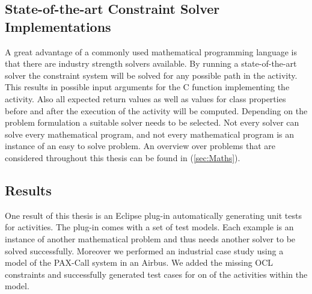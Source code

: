 \subsection{State-of-the-art Constraint Solver Implementations} 
A great advantage of a commonly used mathematical programming language is that there are industry strength solvers available. By running a state-of-the-art solver the constraint system will be solved for any possible path in the activity. This results in possible input arguments for the C function implementing the activity. Also all expected return values as well as values for class properties before and after the execution of the activity will be computed. Depending on the problem formulation a suitable solver needs to be selected. Not every solver can solve every mathematical program, and not every mathematical program is an instance of an easy to solve problem. An overview over problems that are considered throughout this thesis can be found in (\ref{sec:Maths}).
\subsection{Results}
One result of this thesis is an Eclipse plug-in automatically generating unit tests for activities. The plug-in comes with a set of test models. Each example is an instance of another mathematical problem and thus needs another solver to be solved successfully. Moreover we performed an industrial case study using a model of the PAX-Call system in an Airbus. We added the missing OCL constraints and successfully generated test cases for on of the activities within the model.



